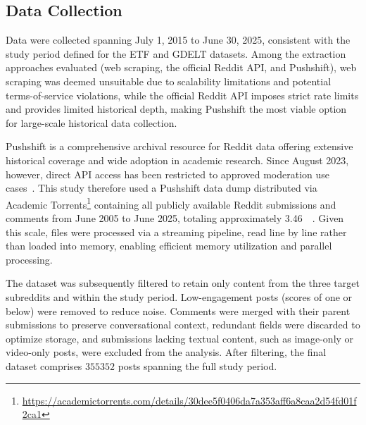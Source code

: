 \subsection{Data Collection}
\label{subsec:reddit_data}

Data were collected spanning July 1, 2015 to June 30, 2025, consistent with the study period defined for the ETF and GDELT datasets. Among the extraction approaches evaluated (web scraping, the official Reddit API, and Pushshift), web scraping was deemed unsuitable due to scalability limitations and potential terms-of-service violations, while the official Reddit API imposes strict rate limits and provides limited historical depth, making Pushshift the most viable option for large-scale historical data collection.

Pushshift is a comprehensive archival resource for Reddit data offering extensive historical coverage and wide adoption in academic research. Since August 2023, however, direct API access has been restricted to approved moderation use cases~\cite{RedditPushshift2023}. This study therefore used a Pushshift data dump distributed via Academic Torrents\footnote{\url{https://academictorrents.com/details/30dee5f0406da7a353aff6a8caa2d54fd01f2ca1}} containing all publicly available Reddit submissions and comments from June 2005 to June 2025, totaling approximately \SI{3.46}{\tera\byte}. Given this scale, files were processed via a streaming pipeline, read line by line rather than loaded into memory, enabling efficient memory utilization and parallel processing.

The dataset was subsequently filtered to retain only content from the three target subreddits and within the study period. Low-engagement posts (scores of one or below) were removed to reduce noise. Comments were merged with their parent submissions to preserve conversational context, redundant fields were discarded to optimize storage, and submissions lacking textual content, such as image-only or video-only posts, were excluded from the analysis. After filtering, the final dataset comprises $\num{355352}$ posts spanning the full study period.